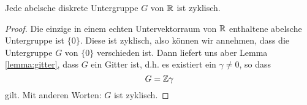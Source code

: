 \begin{cor}
  \label{cor:gitter}
  Jede abelsche diskrete Untergruppe $G$ von $\mathbb{R}$ ist zyklisch.
\end{cor}

\begin{proof}
  Die einzige in einem echten Untervektorraum von $\mathbb{R}$ enthaltene abelsche
  Untergruppe ist $\{0\}$. Diese ist zyklisch, also können wir
  annehmen, dass die Untergruppe $G$ von $\{0\}$ verschieden ist. Dann
  liefert uns aber Lemma \ref{lemma:gitter}, dass $G$ ein Gitter ist,
  d.h. es existiert ein $\gamma \neq 0$, so dass
  \[
  G = \mathbb{Z} \gamma
  \]
  gilt. Mit anderen Worten: $G$ ist zyklisch.
\end{proof}

